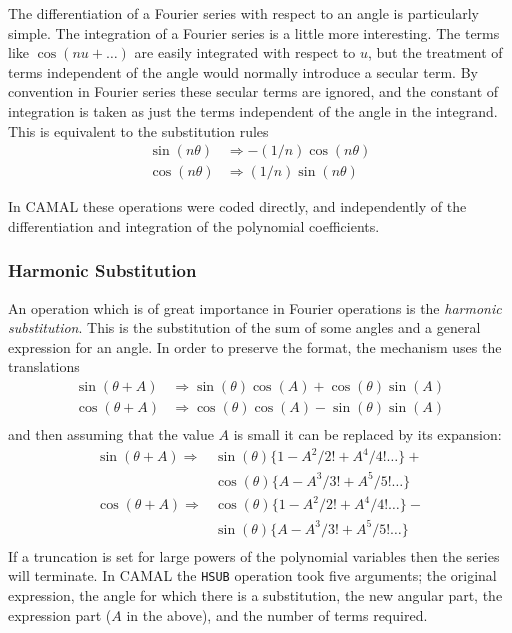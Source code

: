 The differentiation of a Fourier series with respect to an angle is
particularly simple.  The integration of a Fourier series is a little
more interesting.  The terms like $\cos(n u + \ldots)$ are easily
integrated with respect to $u$, but the treatment of terms independent
of the angle would normally introduce a secular term.  By convention
in Fourier series these secular terms are ignored, and the constant of
integration is taken as just the terms independent of the angle in the
integrand.  This is equivalent to the substitution rules
\begin{align*}
\sin(n \theta) & \Rightarrow -(1/n) \cos(n \theta) \\
\cos(n \theta) & \Rightarrow (1/n) \sin(n \theta)
\end{align*}

In CAMAL these operations were coded directly, and independently of
the differentiation and integration of the polynomial coefficients.

\subsubsection{Harmonic Substitution}

An operation which is of great importance in Fourier operations is the
\emph{harmonic substitution}.  This is the substitution of the sum of
some angles and a general expression for an angle.  In order to
preserve the format, the mechanism uses the translations
\begin{align*}
\sin(\theta + A) & \Rightarrow \sin(\theta) \cos(A) +
                                 \cos(\theta) \sin(A) \\
\cos(\theta + A) & \Rightarrow \cos(\theta) \cos(A) -
                                 \sin(\theta) \sin(A) \\
\end{align*}
and then assuming that the value $A$ is small it can be replaced by
its expansion:
\begin{align*}
\sin(\theta + A) \Rightarrow & \sin(\theta) \{1 - A^2/2! + A^4/4!\ldots\} +\\
                             & \cos(\theta) \{A - A^3/3! + A^5/5!\ldots\} \\
\cos(\theta + A) \Rightarrow & \cos(\theta) \{1 - A^2/2! + A^4/4!\ldots\} -\\
                             & \sin(\theta) \{A - A^3/3! + A^5/5! \ldots\} \\
\end{align*}
If a truncation is set for large powers of the polynomial variables
then the series will terminate.  In CAMAL the \texttt{HSUB} operation
took five arguments; the original expression, the angle for which
there is a substitution, the new angular part, the expression part
($A$ in the above), and the number of terms required.

